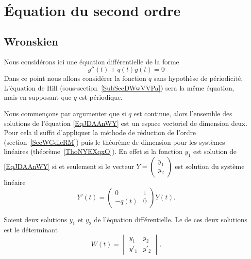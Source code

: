 \section{Équation du second ordre}

\subsection{Wronskien}

Nous considérons ici une équation différentielle de la forme
\begin{equation}    \label{EqJDAAnWY}
	y''(t)+q(t)y(t)=0
\end{equation}
Dans ce point nous allons considérer la fonction \( q\) sans hypothèse de périodicité. L'équation de Hill (sous-section~\ref{SubSecDWwVVPa}) sera la même équation, mais en supposant que \( q\) est périodique.

Nous commençons par argumenter que si \( q\) est continue, alors l'ensemble des solutions de l'équation \eqref{EqJDAAnWY} est un espace vectoriel de dimension deux. Pour cela il suffit d'appliquer la méthode de réduction de l'ordre (section~\ref{SecWGdleRM}) puis le théorème de dimension pour les systèmes linéaires (théorème~\ref{ThoNYEXqxO}). En effet si la fonction \( y_1\) est solution de \eqref{EqJDAAnWY} si et seulement si le vecteur \(Y= \begin{pmatrix}
	y_1 \\
	y_2
\end{pmatrix}\) est solution du système linéaire
\begin{equation}
	Y'(t)=\begin{pmatrix}
		0     & 1 \\
		-q(t) & 0
	\end{pmatrix}Y(t).
\end{equation}

\begin{definition}	\label{DEFooISLFooPUcCIK}
	Soient deux solutions \( y_1\) et \( y_2\) de l'équation différentielle. Le  de ces deux solutions est le déterminant
	\begin{equation}
		W(t)=\begin{vmatrix}
			y_1  & y_2  \\
			y'_1 & y'_2
		\end{vmatrix}.
	\end{equation}
\end{definition}

